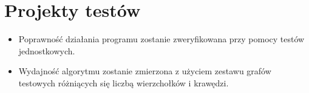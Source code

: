 \section{Projekty testów}
\begin{itemize}
 \item Poprawność działania programu zostanie zweryfikowana przy pomocy testów jednostkowych.
 \item Wydajność algorytmu zostanie zmierzona z użyciem zestawu grafów testowych różniących się liczbą wierzchołków i krawędzi.
\end{itemize}
